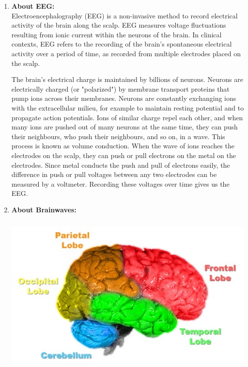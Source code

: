 \documentclass[14pt]{article}
\begin{document}
\begin{enumerate}
	\item \textbf{{\large About EEG:\\}}
Electroencephalography (EEG) is a non-invasive method to record electrical activity of the brain along the scalp. EEG measures voltage fluctuations resulting from ionic current within the neurons of the brain. In clinical contexts, EEG refers to the recording of the brain's spontaneous electrical activity over a period of time, as recorded from multiple electrodes placed on the scalp.


The brain's electrical charge is maintained by billions of neurons. Neurons are electrically charged (or "polarized") by membrane transport proteins that pump ions across their membranes. Neurons are constantly exchanging ions with the extracellular milieu, for example to maintain resting potential and to propagate action potentials. Ions of similar charge repel each other, and when many ions are pushed out of many neurons at the same time, they can push their neighbours, who push their neighbours, and so on, in a wave. This process is known as volume conduction. When the wave of ions reaches the electrodes on the scalp, they can push or pull electrons on the metal on the electrodes. Since metal conducts the push and pull of electrons easily, the difference in push or pull voltages between any two electrodes can be measured by a voltmeter. Recording these voltages over time gives us the EEG.


	\item \textbf{{\large About Brainwaves:}}
\begin{center}
	\graphicspath{ {images/} }
	\includegraphics[width=15cm, height=8cm]{Brain-anatomy}
\end{center}


\end{enumerate}
\end{document}
